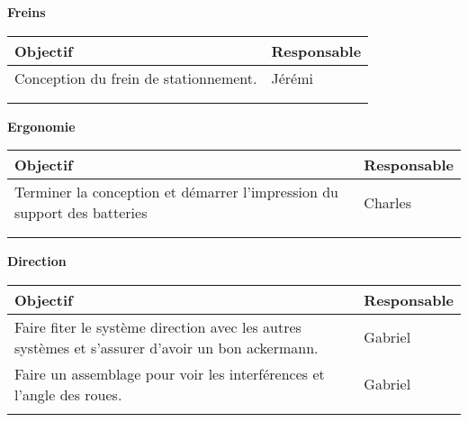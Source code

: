 \hfill \break
\textbf{\large Freins}\\
\begin{tabularx}{\linewidth}{
    |>{\hsize=1.75\hsize}X|%
    >{\hsize=0.25\hsize}X|%
  }
    \hline
    \textbf{Objectif} & \textbf{Responsable} \\\hline
     Conception du frein de stationnement. & Jérémi\\\hline 
       & \\\hline
       & \\\hline 
\end{tabularx}


\hfill \break
\textbf{\large Ergonomie}\\
\begin{tabularx}{\linewidth}{
    |>{\hsize=1.75\hsize}X|%
    >{\hsize=0.25\hsize}X|%
  }
    \hline
    \textbf{Objectif} & \textbf{Responsable} \\\hline
       Terminer la conception et démarrer l'impression du support des batteries & Charles\\\hline 
       & \\\hline
       & \\\hline 
\end{tabularx}

\hfill \break
\textbf{\large Direction}\\
\begin{tabularx}{\linewidth}{
    |>{\hsize=1.75\hsize}X|%
    >{\hsize=0.25\hsize}X|%
  }
    \hline
    \textbf{Objectif} & \textbf{Responsable} \\\hline
        Faire fiter le système direction avec les autres systèmes et s'assurer d'avoir un bon ackermann.&Gabriel
        \\\hline 
        Faire un assemblage pour voir les interférences et l'angle des roues.&Gabriel
        \\\hline
       & \\\hline 
\end{tabularx}


